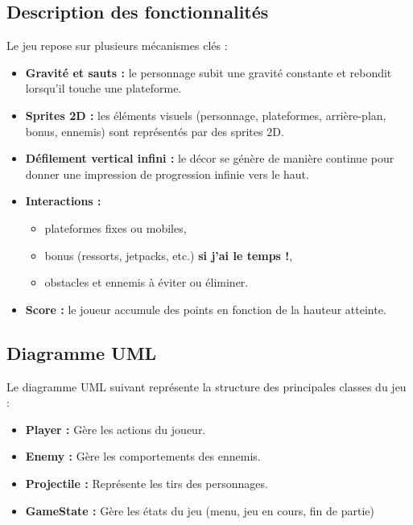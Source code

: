 \documentclass[french]{article}
\begin{document}
\subsection{Description des fonctionnalités}
Le jeu repose sur plusieurs mécanismes clés :
\begin{itemize}
	\item \textbf{Gravité et sauts :} le personnage subit une gravité constante et rebondit lorsqu’il touche une plateforme.
	\item \textbf{Sprites 2D :} les éléments visuels (personnage, plateformes, arrière-plan, bonus, ennemis) sont représentés par des sprites 2D.
	\item \textbf{Défilement vertical infini :} le décor se génère de manière continue pour donner une impression de progression infinie vers le haut.
	\item \textbf{Interactions :}
	      \begin{itemize}
		      \item plateformes fixes ou mobiles,
		      \item bonus (ressorts, jetpacks, etc.) \textbf{si j'ai le temps !},
		      \item obstacles et ennemis à éviter ou éliminer.
	      \end{itemize}
	\item \textbf{Score :} le joueur accumule des points en fonction de la hauteur atteinte.
\end{itemize}

\subsection{Diagramme UML}
Le diagramme UML suivant représente la structure des principales classes du jeu :
\begin{itemize}
	\item \textbf{Player :} Gère les actions du joueur.
	\item \textbf{Enemy :} Gère les comportements des ennemis.
	\item \textbf{Projectile :} Représente les tirs des personnages.
	\item \textbf{GameState :} Gère les états du jeu (menu, jeu en cours, fin de partie)
\end{itemize}
\end{document}
